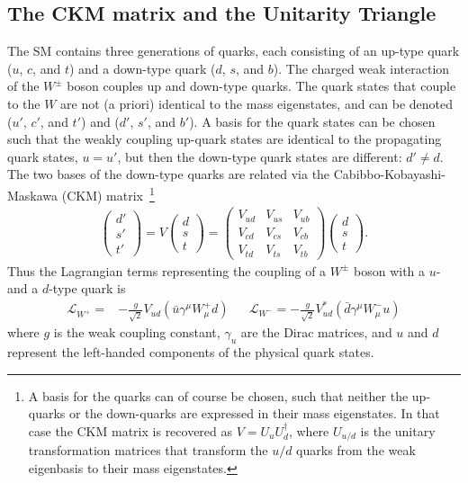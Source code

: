 \subsection{The CKM matrix and the Unitarity Triangle} %
\label{sub:the_ckm_matrix}

The SM contains three generations of quarks, each consisting of an up-type quark ($u$, $c$, and $t$) and a down-type quark ($d$, $s$, and $b$). The charged weak interaction of the $W^\pm$ boson couples up and down-type quarks. The quark states that couple to the $W$ are not (a priori) identical to the mass eigenstates, and can be denoted ($u'$, $c'$, and $t'$) and ($d'$, $s'$, and $b'$). A basis for the quark states can be chosen such that the weakly coupling up-quark states are identical to the propagating quark states, $u=u'$, but then the down-type quark states are different: $d'\neq d$. The two bases of the down-type quarks are related via the Cabibbo-Kobayashi-Maskawa (CKM) matrix~\cite{kobayashiCPViolationRenormalizableTheory1973,cabibboUnitarySymmetryLeptonic1963}\footnote{
    A basis for the quarks can of course be chosen, such that neither the up-quarks or the down-quarks are expressed in their mass eigenstates. In that case the CKM matrix is recovered as $V=U_u U_d^\dagger$, where $U_{u/d}$ is the unitary transformation matrices that transform the $u/d$ quarks from the weak eigenbasis to their mass eigenstates.
}
\begin{align}
    \begin{pmatrix}
        d' \\ s' \\ t'
    \end{pmatrix}
    = V \begin{pmatrix}
            d \\ s \\ t
    \end{pmatrix} 
    =
    \begin{pmatrix}
        V_{ud} & V_{us} & V_{ub} \\
        V_{cd} & V_{cs} & V_{cb} \\
        V_{td} & V_{ts} & V_{tb} 
    \end{pmatrix}
    \begin{pmatrix}
            d \\ s \\ t
    \end{pmatrix}.
\end{align}
Thus the Lagrangian terms representing the coupling of a $W^\pm$ boson with a $u$- and a $d$-type quark is
\begin{align}\label{eq:W_coupling}
   \mathcal L_{W^+}= &-\frac{g}{\sqrt{2}}V_{ud} \left(\bar u \gamma^\mu W_\mu^+ d \right)&& \mathcal L_{W^-}=-\frac{g}{\sqrt{2}} V_{ud}^* \left( \bar d \gamma^\mu W_\mu^- u\right)
\end{align}
where $g$ is the weak coupling constant, $\gamma_u$ are the Dirac matrices, and $u$ and $d$ represent the left-handed components of the physical quark states.

